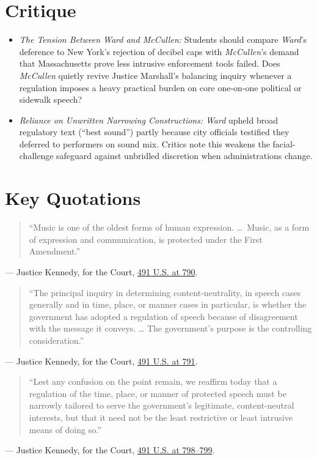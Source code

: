 \documentclass[12pt]{article}
\begin{document}
\begin{enumerate}
\end{enumerate}

\section{Critique}
\begin{itemize}
  \item \textit{The Tension Between \textit{Ward} and \textit{McCullen}:} Students should compare \textit{Ward}'s deference to New York's rejection of decibel caps with \textit{McCullen}'s demand that Massachusetts prove less intrusive enforcement tools failed. Does \textit{McCullen} quietly revive Justice Marshall's balancing inquiry whenever a regulation imposes a heavy practical burden on core one-on-one political or sidewalk speech?
  \item \textit{Reliance on Unwritten Narrowing Constructions:} \textit{Ward} upheld broad regulatory text (``best sound'') partly because city officials testified they deferred to performers on sound mix. Critics note this weakens the facial-challenge safeguard against unbridled discretion when administrations change.
\end{itemize}

\section{Key Quotations}
\begin{quote}
``Music is one of the oldest forms of human expression. \dots\ Music, as a form of expression and communication, is protected under the First Amendment.''
\end{quote}
\noindent --- Justice Kennedy, for the Court, \href{https://supreme.justia.com/cases/federal/us/491/781/}{491 U.S. at 790}.

\begin{quote}
``The principal inquiry in determining content-neutrality, in speech cases generally and in time, place, or manner cases in particular, is whether the government has adopted a regulation of speech because of disagreement with the message it conveys. \dots{} The government's purpose is the controlling consideration.''
\end{quote}
\noindent --- Justice Kennedy, for the Court, \href{https://supreme.justia.com/cases/federal/us/491/781/}{491 U.S. at 791}.

\begin{quote}
``Lest any confusion on the point remain, we reaffirm today that a regulation of the time, place, or manner of protected speech must be narrowly tailored to serve the government's legitimate, content-neutral interests, but that it need not be the least restrictive or least intrusive means of doing so.''
\end{quote}
\noindent --- Justice Kennedy, for the Court, \href{https://supreme.justia.com/cases/federal/us/491/781/}{491 U.S. at 798--799}.
\end{document}

